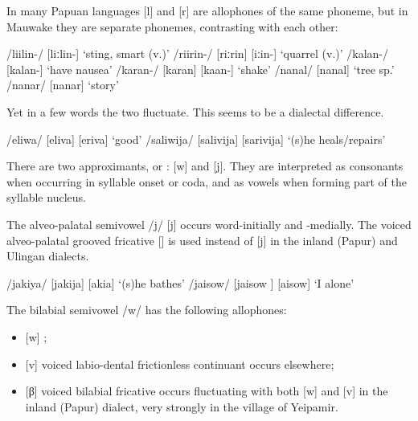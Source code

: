 In many Papuan languages [l] and [r] are allophones of the same phoneme, but in Mauwake they are separate phonemes, contrasting with each other:

\ea
\ea
/liilin-/  [liːlin-]  `sting, smart (v.)'
\ex
/riirin-/  [{{\textprimstress}riːrin}] {\Tilde} [{{\textprimstress}}{\textfishhookr}iː{\textfishhookr}in-]  `quarrel (v.)'
\ex
/kalan-/  [ka{{\textprimstress}lan}-]  `have nausea' 
\ex
/karan-/  [ka{{\textprimstress}ran}] {\Tilde} [ka{{\textprimstress}}{\textfishhookr}an-]  `shake'
\ex
/nanal/  [na{{\textprimstress}nal}]  `tree sp.'
\ex
/nanar/  [na{{\textprimstress}nar}]  `story'
\z
\z

Yet in a few words the two fluctuate. This seems to be a dialectal difference.

\ea
\ea
/eliwa/  [e{{\textprimstress}liva}] {\Tilde} [e{{\textprimstress}riva}]  `good'
\ex
/saliwija/  [sa{{\textprimstress}livija}] {\Tilde} [sa{{\textprimstress}rivija}]  `(s)he heals/repairs'
\z
\z 

There are two approximants, or : [w] and [j].  They are interpreted as consonants when occurring in syllable onset or coda, and as vowels when forming part of the syllable nucleus. 

The alveo-palatal semivowel /j/ [j] occurs word-initially and -medially. The voiced alveo-palatal grooved fricative [{\textyogh}] is used instead of [j] in the inland (Papur) and Ulingan dialects.

\ea
\ea
/jakiya/  [ja{{\textprimstress}kija}] {\Tilde} [{\textyogh}a{{\textprimstress}ki}{\textyogh}a]  `(s)he bathes'
\ex
/jaisow/  [{{\textprimstress}jaisow} ] {\Tilde} [{{\textprimstress}}{\textyogh}aisow]  `I alone' 
\z
\z

The bilabial semivowel /w/ has the following allophones:

\begin{itemize}
 \item{} [w]  ;
 \item{} [v]  voiced labio-dental frictionless continuant occurs elsewhere;
 \item{} [β]  voiced bilabial fricative occurs fluctuating with both [w] and [v] in the inland (Papur) dialect, very strongly in the village of Yeipamir.
\end{itemize}


